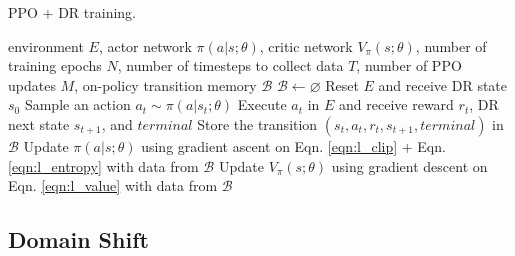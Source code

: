 \begin{algorithm}
\caption{PPO + DR training.}
\label{alg:overall_algo}
\begin{algorithmic}
\REQUIRE environment $E$, actor network $\pi(a|s;\theta)$, critic network $V_{\pi}(s;\theta)$, number of training epochs $N$, number of timesteps to collect data $T$, number of PPO updates $M$, on-policy transition memory $\mathcal{B}$
  \STATE $\mathcal{B} \gets \varnothing$
      \STATE Reset $E$ and receive DR \indent\indent state $s_0$
    \ENDIF
    \STATE Sample an action $a_t \sim \pi(a|s_t;\theta)$
    \STATE Execute $a_{t}$ in $E$ and receive reward $r_t$, DR next \indent\indent state $s_{t+1}$, and $terminal$
    \STATE Store the transition $\left(s_t, a_t, r_t, s_{t+1}, terminal \right)$ in $\mathcal{B}$
  \ENDFOR
    \STATE Update $\pi(a|s;\theta)$ using gradient ascent on Eqn. \ref{eqn:l_clip} \indent\indent + Eqn. \ref{eqn:l_entropy} with data from $\mathcal{B}$
    \STATE Update $V_{\pi}(s;\theta)$ using gradient descent on Eqn. \ref{eqn:l_value} \indent\indent with data from $\mathcal{B}$
  \ENDFOR
\ENDFOR
\end{algorithmic}
\end{algorithm}

\hypertarget{domain-shift}{%
\subsection{Domain Shift}\label{domain-shift}}

\label{sec:domain_shift}

